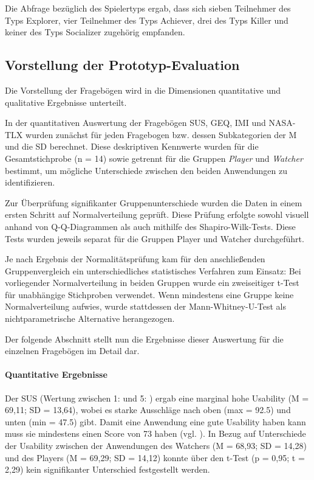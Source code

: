 Die Abfrage bezüglich des Spielertyps ergab, dass sich sieben Teilnehmer des Typs Explorer, vier Teilnehmer des Typs Achiever, drei des Typs Killer und keiner des Typs Socializer zugehörig empfanden.

\subsection{Vorstellung der Prototyp-Evaluation}
Die Vorstellung der Fragebögen wird in die Dimensionen quantitative und qualitative Ergebnisse unterteilt.

In der quantitativen Auswertung der Fragebögen \ac{SUS}, \ac{GEQ}, \ac{IMI} und \ac{NASA-TLX} wurden zunächst für jeden Fragebogen bzw. dessen Subkategorien der \ac{M} und die \ac{SD} berechnet. Diese deskriptiven Kennwerte wurden für die Gesamtstichprobe (n = 14) sowie getrennt für die Gruppen \textit{Player} und \textit{Watcher} bestimmt, um mögliche Unterschiede zwischen den beiden Anwendungen zu identifizieren.

Zur Überprüfung signifikanter Gruppenunterschiede wurden die Daten in einem ersten Schritt auf Normalverteilung geprüft. Diese Prüfung erfolgte sowohl visuell anhand von \ac{Q-Q}-Diagrammen als auch mithilfe des Shapiro-Wilk-Tests. Diese Tests wurden jeweils separat für die Gruppen Player und Watcher durchgeführt. 

Je nach Ergebnis der Normalitätsprüfung kam für den anschließenden Gruppenvergleich ein unterschiedliches statistisches Verfahren zum Einsatz: Bei vorliegender Normalverteilung in beiden Gruppen wurde ein zweiseitiger t-Test für unabhängige Stichproben verwendet. Wenn mindestens eine Gruppe keine Normalverteilung aufwies, wurde stattdessen der Mann-Whitney-U-Test als nichtparametrische Alternative herangezogen.

Der folgende Abschnitt stellt nun die Ergebnisse dieser Auswertung für die einzelnen Fragebögen im Detail dar.
\paragraph{Quantitative Ergebnisse}
Der \ac{SUS} (Wertung zwischen 1:  und 5: ) ergab eine marginal hohe Usability (M = 69,11; SD = 13,64), wobei es starke Ausschläge nach oben (max = 92.5) und unten (min = 47.5) gibt. Damit eine Anwendung eine gute Usability haben kann muss sie mindestens einen Score von 73 haben (vgl. \cite[S. 36]{brooke_sus_2013}). In Bezug auf Unterschiede der Usability zwischen der Anwendungen des Watchers (M = 68,93; SD = 14,28) und des Players (M = 69,29; SD = 14,12) konnte über den t-Test (p = 0,95; t = 2,29) kein signifikanter Unterschied festgestellt werden.

